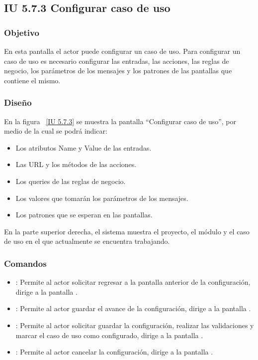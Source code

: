 \newpage 
\subsection{IU 5.7.3 Configurar caso de uso}
\subsubsection{Objetivo}
	
	En esta pantalla el actor puede configurar un caso de uso. Para configurar un caso de uso  es necesario configurar las entradas, las acciones, las 
	reglas de negocio, los parámetros de los mensajes y los patrones de las pantallas que contiene el mismo.

\subsubsection{Diseño}

    En la figura ~\ref{IU 5.7.3} se muestra la pantalla ``Configurar caso de uso'', por medio de la cual 
    se podrá indicar: 
    
    \begin{itemize}
    	\item Los atributos Name y Value de las entradas.
    	\item Las URL y los métodos de las acciones.
    	\item Los queries de las reglas de negocio.
    	\item Los valores que tomarán los parámetros de los mensajes.
    	\item Los patrones que se esperan en las pantallas.
    \end{itemize}
	
	En la parte superior derecha, el sistema muestra el proyecto, el módulo y el caso de uso  en el que actualmente se encuentra trabajando.



\subsubsection{Comandos}
\begin{itemize}
	\item {}: Permite al actor solicitar regresar a la pantalla anterior de la configuración, dirige a la pantalla .
	\item {}: Permite al actor guardar el avance de la configuración, dirige a la pantalla .
	\item {}: Permite al actor solicitar guardar la configuración, realizar las validaciones y marcar el caso de uso como configurado, dirige a la pantalla .
	\item {}: Permite al actor cancelar la configuración, dirige a la pantalla .
	
	
\end{itemize}

